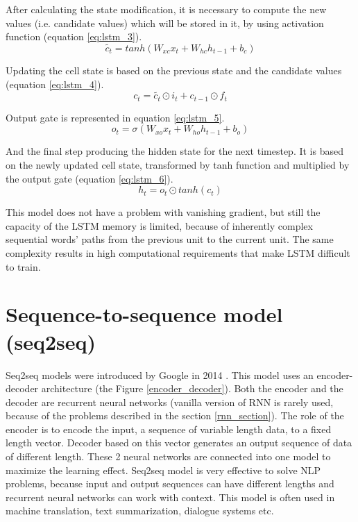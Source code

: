 After calculating the state modification, it is necessary to compute the new values (i.e. candidate values) which will be stored in it, by using activation function (equation \ref{eq:lstm_3}).
\begin{equation} \label{eq:lstm_3}
\tilde{c_{t}}=tanh(W_{xc}x_t + W_{hc}h_{t-1} + b_c)
\end{equation}

Updating the cell state is based on the previous state and the candidate values (equation \ref{eq:lstm_4}).
\begin{equation} \label{eq:lstm_4}
c_t = \tilde{c_{t}} \odot i_t + c_{t-1} \odot f_t
\end{equation}

Output gate is represented in equation \ref{eq:lstm_5}.
\begin{equation} \label{eq:lstm_5}
o_t = \sigma(W_{xo}x_t + W_{ho}h_{t-1}+b_o)
\end{equation}

And the final step producing the hidden state for the next timestep. It is based on the newly updated cell state, transformed by tanh function and multiplied by the output gate (equation \ref{eq:lstm_6}).
\begin{equation} \label{eq:lstm_6}
h_t = o_t \odot tanh(c_t)
\end{equation}

This model does not have a problem with vanishing gradient, but still the capacity of the LSTM memory is limited, because of inherently complex sequential words' paths from the previous unit to the current unit. The same complexity results in high computational requirements that make LSTM difficult to train. 

\section{Sequence-to-sequence model (seq2seq)} \label{seq2seq_section}

Seq2seq models were introduced by Google in 2014 \cite{sutskever2014sequence}. This model uses an encoder-decoder architecture (the Figure \ref{encoder_decoder}). Both the encoder and the decoder are recurrent neural networks (vanilla version of RNN is rarely used, because of the problems described in the section \ref{rnn_section}). The role of the encoder is to encode the input, a sequence of variable length data, to a fixed length vector. Decoder based on this vector generates an output sequence of data of different length. These 2 neural networks are connected into one model to maximize the learning effect. Seq2seq model is very effective to solve NLP problems, because input and output sequences can have different lengths and recurrent neural networks can work with context. This model is often used in machine translation, text summarization, dialogue systems etc.

